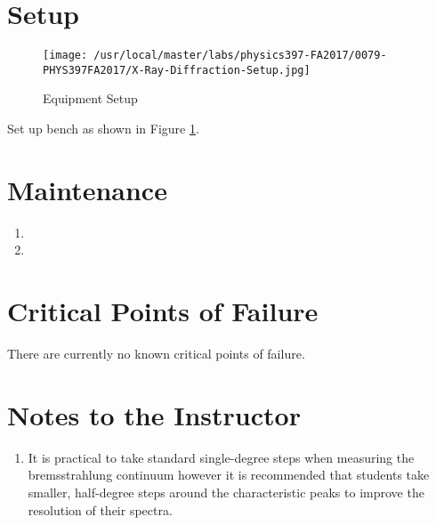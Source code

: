 \section{Setup}
\begin{figure}
\texttt{[image: /usr/local/master/labs/physics397-FA2017/0079-PHYS397FA2017/X-Ray-Diffraction-Setup.jpg]}
\caption{Equipment Setup}
\label{pic:XRsetup}
\end{figure}

Set up bench as shown in Figure \ref{pic:XRsetup}.

\section{Maintenance}

\begin{enumerate}
\item 
\item 
\end{enumerate}

\section{Critical Points of Failure}

There are currently no known critical points of failure.

\section{Notes to the Instructor}
\begin{enumerate}
\item It is practical to take standard single-degree steps when measuring the bremsstrahlung continuum however it is recommended that students take smaller, half-degree steps around the characteristic peaks to improve the resolution of their spectra.
\end{enumerate}

